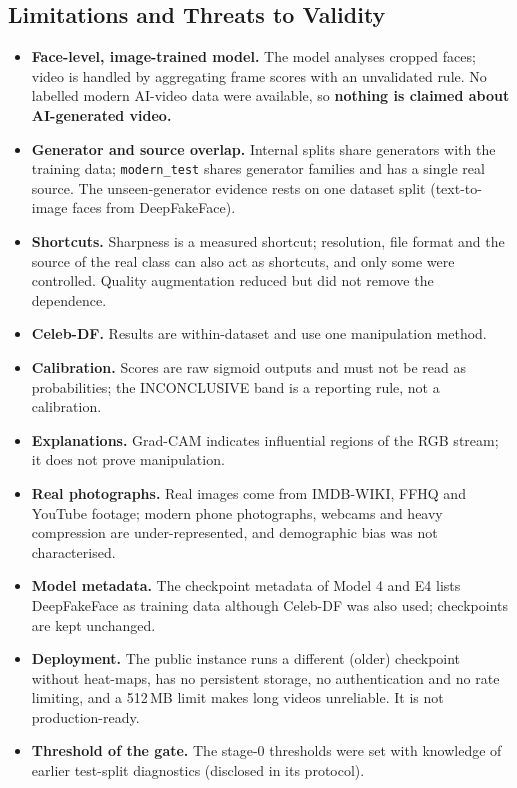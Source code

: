 \subsection{Limitations and Threats to Validity}
\label{sec:limits}
\begin{itemize}
\item \textbf{Face-level, image-trained model.} The model analyses cropped faces; video is handled by aggregating frame scores with an unvalidated rule.
No labelled modern AI-video data were available, so \textbf{nothing is claimed about AI-generated video.}
\item \textbf{Generator and source overlap.} Internal splits share generators with the training data; \texttt{modern\_test} shares generator families and has a single real source.
The unseen-generator evidence rests on one dataset split (text-to-image faces from DeepFakeFace).
\item \textbf{Shortcuts.} Sharpness is a measured shortcut; resolution, file format and the source of the real class can also act as shortcuts, and
only some were controlled. Quality augmentation reduced but did not remove the dependence.
\item \textbf{Celeb-DF.} Results are within-dataset and use one manipulation method.
\item \textbf{Calibration.} Scores are raw sigmoid outputs and must not be read as probabilities; the INCONCLUSIVE band is a reporting rule, not a calibration.
\item \textbf{Explanations.} Grad-CAM indicates influential regions of the RGB stream; it does not prove manipulation.
\item \textbf{Real photographs.} Real images come from IMDB-WIKI, FFHQ and YouTube footage; modern phone photographs, webcams and heavy compression are under-represented, and demographic bias was not characterised.
\item \textbf{Model metadata.} The checkpoint metadata of Model 4 and E4 lists DeepFakeFace as training data although Celeb-DF was also used; checkpoints are kept unchanged.
\item \textbf{Deployment.} The public instance runs a different (older) checkpoint without heat-maps, has no persistent storage, no authentication and no rate limiting, and a 512\,MB limit makes long videos unreliable. It is not production-ready.
\item \textbf{Threshold of the gate.} The stage-0 thresholds were set with knowledge of earlier test-split diagnostics (disclosed in its protocol).
\end{itemize}

